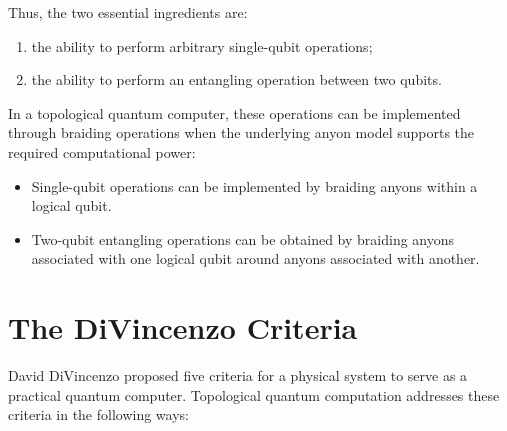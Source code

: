 \documentclass[11pt]{article}
\begin{document}
	Thus, the two essential ingredients are:
	\begin{enumerate}
		\item the ability to perform arbitrary single-qubit operations;
		\item the ability to perform an entangling operation between two qubits.
	\end{enumerate}
	
	In a topological quantum computer, these operations can be implemented through braiding operations when the underlying anyon model supports the required computational power:
	
	\begin{itemize}
		\item[$\bullet$] Single-qubit operations can be implemented by braiding anyons within a logical qubit.
		\item[$\bullet$] Two-qubit entangling operations can be obtained by braiding anyons associated with one logical qubit around anyons associated with another.
	\end{itemize}
	
	
	\section{The DiVincenzo Criteria}
	
	David DiVincenzo proposed five criteria for a physical system to serve as a practical quantum computer. Topological quantum computation addresses these criteria in the following ways:
	
\end{document}
